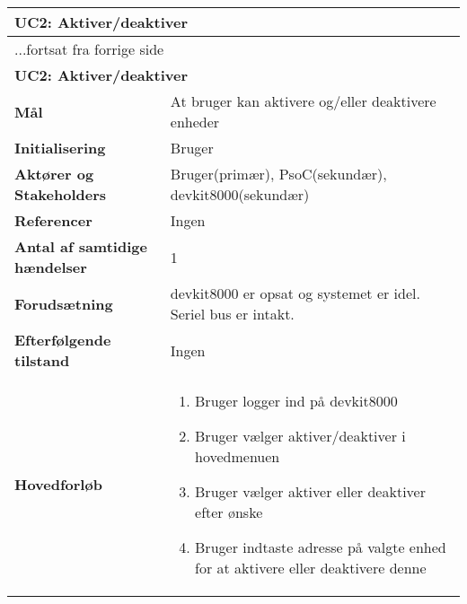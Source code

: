 \begin{center} \centering
	\begin{longtable}{|p{6cm}|p{8cm}|}  %
	\hline
		\multicolumn{2}{|l|}{\textbf{UC2: Aktiver/deaktiver}} \\\hline %
		\endfirsthead
		
		\multicolumn{2}{l}{...fortsat fra forrige side} \\ \hline %
		\multicolumn{2}{|l|}{\textbf{UC2: Aktiver/deaktiver}} \\\hline %
		\endhead	
		
		\textbf{Mål}								&At bruger kan aktivere og/eller deaktivere enheder			\\\hline
		\textbf{Initialisering}					&Bruger			\\\hline
		\textbf{Aktører og Stakeholders}			&Bruger(primær), PsoC(sekundær), devkit8000(sekundær)			\\\hline
		\textbf{Referencer}						&Ingen			\\\hline
		\textbf{Antal af samtidige hændelser}	&1			\\\hline
		\textbf{Forudsætning}					&devkit8000 er opsat og systemet er idel. Seriel bus er intakt.			\\\hline
		\textbf{Efterfølgende tilstand}			&Ingen			\\\hline
		\textbf{Hovedforløb}					
			&\begin{enumerate}
	
				\item Bruger logger ind på devkit8000
				
				\item Bruger vælger aktiver/deaktiver i hovedmenuen
				
				\item Bruger vælger aktiver eller deaktiver efter ønske
				
				\item Bruger indtaste adresse på valgte enhed for at aktivere eller deaktivere denne
	
			\end{enumerate}\\\hline
	\end{longtable}
	\label{UC2} 
\end{center}

